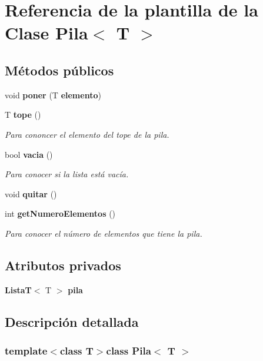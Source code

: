 \section{Referencia de la plantilla de la Clase Pila$<$ T $>$}
\label{classPila}
\subsection*{Métodos públicos}
\begin{DoxyCompactItemize}
\item 
void {\bfseries poner} (T {\bf elemento})\label{classPila_abc2b8c2fc99f5f750510cf9ce96a7ba4}

\item 
T {\bf tope} ()
\begin{DoxyCompactList}\small\item\em Para cononcer el elemento del tope de la pila. \end{DoxyCompactList}\item 
bool {\bf vacia} ()
\begin{DoxyCompactList}\small\item\em Para conocer si la lista está vacía. \end{DoxyCompactList}\item 
void {\bfseries quitar} ()\label{classPila_a7eb7aca18dffbc1d570195de1e446054}

\item 
int {\bf get\-Numero\-Elementos} ()
\begin{DoxyCompactList}\small\item\em Para conocer el número de elementos que tiene la pila. \end{DoxyCompactList}\end{DoxyCompactItemize}
\subsection*{Atributos privados}
\begin{DoxyCompactItemize}
\item 
{\bf Lista\-T}$<$ T $>$ {\bfseries pila}\label{classPila_a9b6c14574bc7dfb7553b6bb3f9b2daae}

\end{DoxyCompactItemize}


\subsection{Descripción detallada}
\subsubsection*{template$<$class T$>$class Pila$<$ T $>$}



